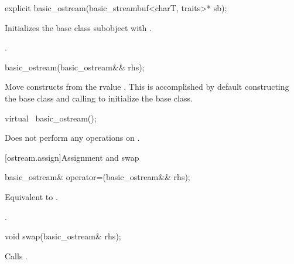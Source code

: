 %
\begin{itemdecl}
explicit basic_ostream(basic_streambuf<charT, traits>* sb);
\end{itemdecl}

%
\begin{itemdescr}
\pnum
\effects
Initializes the base class subobject with
.

\pnum
\ensures
{}.
\end{itemdescr}

%
\begin{itemdecl}
basic_ostream(basic_ostream&& rhs);
\end{itemdecl}

\begin{itemdescr}
\pnum
\effects
Move constructs from the rvalue .
This is accomplished by default constructing the base class and calling
 to initialize the
base class.
\end{itemdescr}

%
\begin{itemdecl}
virtual ~basic_ostream();
\end{itemdecl}

\begin{itemdescr}
\pnum
\remarks
Does not perform any operations on
.
\end{itemdescr}

[ostream.assign]{Assignment and swap}

%
\begin{itemdecl}
basic_ostream& operator=(basic_ostream&& rhs);
\end{itemdecl}

\begin{itemdescr}
\pnum
\effects
Equivalent to .

\pnum
\returns
{}.
\end{itemdescr}

%
\begin{itemdecl}
void swap(basic_ostream& rhs);
\end{itemdecl}

\begin{itemdescr}
\pnum
\effects
Calls .
\end{itemdescr}

